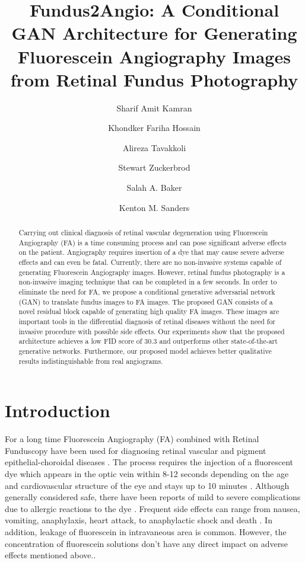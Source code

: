 \documentclass[runningheads]{llncs}
\title{Fundus2Angio: A Conditional GAN Architecture for Generating Fluorescein Angiography Images from Retinal Fundus Photography}
\author{Sharif Amit Kamran\inst{1} \and 
Khondker Fariha Hossain\inst{2}\and  Alireza Tavakkoli\inst{1} \and Stewart Zuckerbrod\inst{3} \and Salah A. Baker\inst{4} \and Kenton M. Sanders\inst{4}}
\institute{University of Nevada, Reno, NV 89557\\
\and
Deakin University, Melbourne, AUS\\
\and
Houston Eye Associates, Houston, TX 77801\\
\and
University of Nevada School of Medicine, Reno, NV 89557}
\begin{document}
\maketitle              \begin{abstract}
Carrying out clinical diagnosis of retinal vascular degeneration using Fluorescein Angiography (FA) is a time consuming process and can pose significant adverse effects on the patient. Angiography requires insertion of a dye that may cause severe adverse effects and can even be fatal. Currently, there are no non-invasive systems capable of generating Fluorescein Angiography images. However, retinal fundus photography is a non-invasive imaging technique that can be completed in a few seconds. In order to eliminate the need for FA, we propose a conditional generative adversarial network (GAN) to translate fundus images to FA images. The proposed GAN consists of a novel residual block capable of generating high quality FA images. These images are important tools in the differential diagnosis of retinal diseases without the need for invasive procedure with possible side effects. Our experiments show that the proposed architecture achieves a low FID score of 30.3 and outperforms other state-of-the-art generative networks. Furthermore, our proposed model achieves better qualitative results indistinguishable from real angiograms.
\end{abstract}
\section{Introduction}
\label{sec:intro}

For a long time Fluorescein Angiography (FA) combined with Retinal Funduscopy have been used for diagnosing retinal vascular and pigment epithelial-choroidal diseases \cite{mary2016retinal}. The process requires the injection of a fluorescent dye which appears in the optic vein within 8-12 seconds depending on the age and cardiovascular structure of the eye and stays up to 10 minutes \cite{mandava2004fluorescein}. Although generally considered safe, there have been reports of mild to severe complications due to allergic reactions to the dye \cite{brockow2014hypersensitivity}. Frequent side effects can range from nausea, vomiting, anaphylaxis, heart attack, to anaphylactic shock and death \cite{lira2007adverse}. In addition, leakage of fluorescein in intravaneous area is common. However, the concentration of fluorescein solutions don't have any direct impact on adverse effects mentioned above.\cite{yannuzzi1986fluorescein}.
\end{document}
